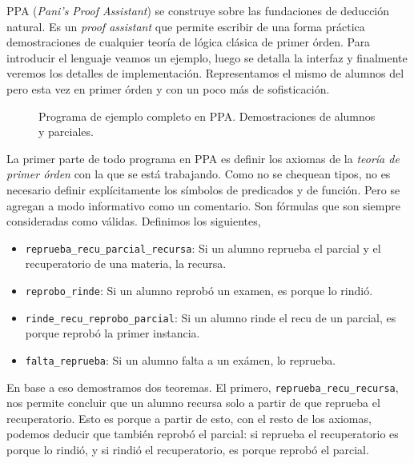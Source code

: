 PPA (\textit{Pani's Proof Assistant}) se construye sobre las fundaciones de
deducción natural. Es un \textit{proof assistant} que permite escribir de una
forma práctica demostraciones de cualquier teoría de lógica clásica de primer
órden. Para introducir el lenguaje veamos un ejemplo, luego se detalla la
interfaz y finalmente veremos los detalles de implementación. Representamos el
mismo de alumnos del  pero esta vez en primer órden y con un
poco más de sofisticación.

\begin{figure}[H]
    
    \caption{Programa de ejemplo completo en PPA. Demostraciones de alumnos y parciales.}
    \label{ppa:prog:alumnos}
\end{figure}


La primer parte de todo programa en PPA es definir los axiomas de la
\textit{teoría de primer órden} con la que se está trabajando. Como no se
chequean tipos, no es necesario definir explícitamente los símbolos de
predicados y de función. Pero se agregan a modo informativo como un comentario.
Son fórmulas que son siempre consideradas como válidas. Definimos los siguientes,
\begin{itemize}
    \item \lstinline{reprueba_recu_parcial_recursa}: Si un alumno reprueba el
    parcial y el recuperatorio de una materia, la recursa.
    \item \lstinline{reprobo_rinde}: Si un alumno reprobó un examen, es porque lo
    rindió.
    \item \lstinline{rinde_recu_reprobo_parcial}: Si un alumno rinde el recu de
    un parcial, es porque reprobó la primer instancia.
    \item \lstinline{falta_reprueba}: Si un alumno falta a un exámen, lo reprueba.
\end{itemize}



En base a eso demostramos dos teoremas. El primero,
\lstinline{reprueba_recu_recursa}, nos permite concluir que un alumno recursa
solo a partir de que reprueba el recuperatorio. Esto es porque a partir de esto,
con el resto de los axiomas, podemos deducir que también reprobó el parcial: si
reprueba el recuperatorio es porque lo rindió, y si rindió el recuperatorio, es
porque reprobó el parcial.

\begin{figure}[H]
    
\end{figure}

